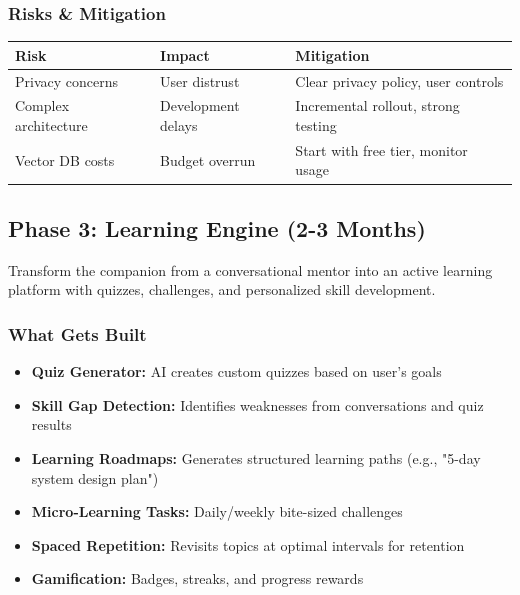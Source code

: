\documentclass[12pt,a4paper]{article}
\begin{document}
\subsubsection{Risks \& Mitigation}

\begin{table}[h]
\centering
\begin{tabularx}{\textwidth}{|l|X|X|}
\hline
\textbf{Risk} & \textbf{Impact} & \textbf{Mitigation} \\
\hline
Privacy concerns & User distrust & Clear privacy policy, user controls \\
\hline
Complex architecture & Development delays & Incremental rollout, strong testing \\
\hline
Vector DB costs & Budget overrun & Start with free tier, monitor usage \\
\hline
\end{tabularx}
\end{table}

\newpage

\subsection{Phase 3: Learning Engine (2-3 Months)}

\begin{tcolorbox}[colback=switchitorange!5,colframe=switchitorange,title=\textbf{Phase 3 Goal}]
Transform the companion from a conversational mentor into an active learning platform with quizzes, challenges, and personalized skill development.
\end{tcolorbox}

\subsubsection{What Gets Built}

\begin{itemize}[leftmargin=*]
    \item \textbf{Quiz Generator:} AI creates custom quizzes based on user's goals
    \item \textbf{Skill Gap Detection:} Identifies weaknesses from conversations and quiz results
    \item \textbf{Learning Roadmaps:} Generates structured learning paths (e.g., "5-day system design plan")
    \item \textbf{Micro-Learning Tasks:} Daily/weekly bite-sized challenges
    \item \textbf{Spaced Repetition:} Revisits topics at optimal intervals for retention
    \item \textbf{Gamification:} Badges, streaks, and progress rewards
\end{itemize}
\end{document}
